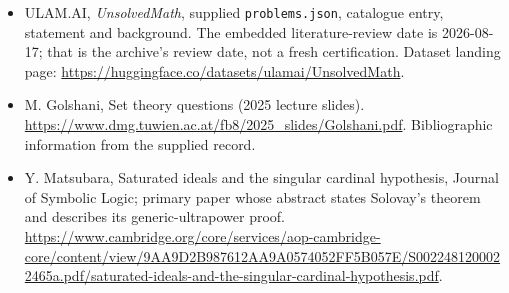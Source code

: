 \documentclass[11pt,a4paper]{article}
\begin{document}
{\small

\begin{itemize}

\item[\hypertarget{source:statement:1}{S1}] ULAM.AI, \emph{UnsolvedMath}, supplied \texttt{problems.json}, catalogue entry, statement and background. The embedded literature-review date is 2026-08-17; that is the archive’s review date, not a fresh certification. Dataset landing page: \url{https://huggingface.co/datasets/ulamai/UnsolvedMath}.

\item[\hypertarget{source:statement:2}{S2}] M. Golshani, Set theory questions (2025 lecture slides). \url{https://www.dmg.tuwien.ac.at/fb8/2025_slides/Golshani.pdf}. Bibliographic information from the supplied record.

\item[R1] Y. Matsubara, Saturated ideals and the singular cardinal hypothesis, Journal of Symbolic Logic; primary paper whose abstract states Solovay’s theorem and describes its generic-ultrapower proof.
\url{https://www.cambridge.org/core/services/aop-cambridge-core/content/view/9AA9D2B987612AA9A0574052FF5B057E/S0022481200022465a.pdf/saturated-ideals-and-the-singular-cardinal-hypothesis.pdf}.
\end{itemize}

}

\label{end:statement}
\end{document}
